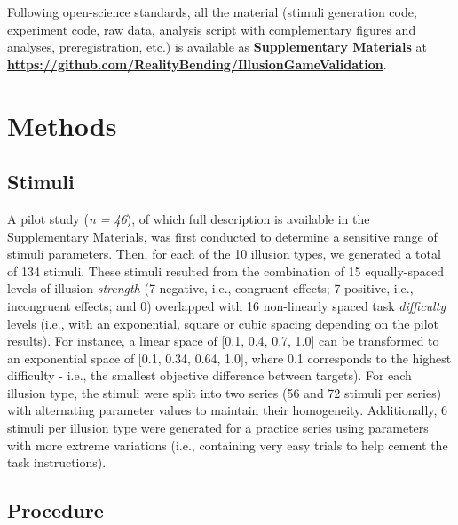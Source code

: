 \documentclass[
  man,floatsintext]{apa6}
\begin{document}
Following open-science standards, all the material (stimuli generation code, experiment code, raw data, analysis script with complementary figures and analyses, preregistration, etc.) is available as \textbf{Supplementary Materials} at \href{https://github.com/RealityBending/IllusionGameValidation}{\textbf{https://github.com/RealityBending/IllusionGameValidation}}.

\hypertarget{methods}{%
\section{Methods}\label{methods}}

\hypertarget{stimuli}{%
\subsection{Stimuli}\label{stimuli}}

A pilot study (\emph{n = 46}), of which full description is available in the Supplementary Materials, was first conducted to determine a sensitive range of stimuli parameters. Then, for each of the 10 illusion types, we generated a total of 134 stimuli. These stimuli resulted from the combination of 15 equally-spaced levels of illusion \emph{strength} (7 negative, i.e., congruent effects; 7 positive, i.e., incongruent effects; and 0) overlapped with 16 non-linearly spaced task \emph{difficulty} levels (i.e., with an exponential, square or cubic spacing depending on the pilot results). For instance, a linear space of {[}0.1, 0.4, 0.7, 1.0{]} can be transformed to an exponential space of {[}0.1, 0.34, 0.64, 1.0{]}, where 0.1 corresponds to the highest difficulty - i.e., the smallest objective difference between targets). For each illusion type, the stimuli were split into two series (56 and 72 stimuli per series) with alternating parameter values to maintain their homogeneity. Additionally, 6 stimuli per illusion type were generated for a practice series using parameters with more extreme variations (i.e., containing very easy trials to help cement the task instructions).

\hypertarget{procedure}{%
\subsection{Procedure}\label{procedure}}
\end{document}

